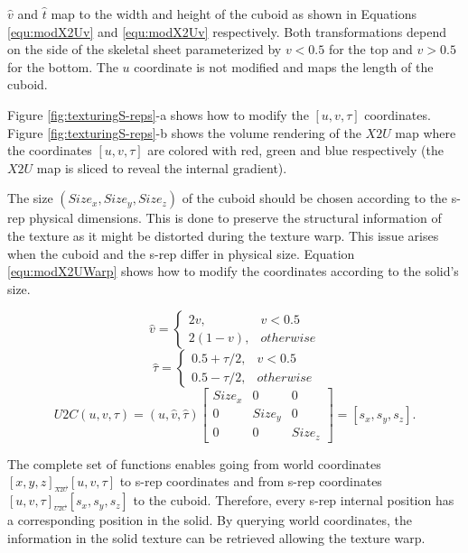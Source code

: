 $\hat v$ and $\hat t$
map to the width and height of the cuboid 
as shown in Equations \ref{equ:modX2Uv} and \ref{equ:modX2Uv} respectively. 
Both transformations depend on the side of the skeletal sheet parameterized by $v < 0.5$ for the top 
and $v > 0.5$ for the bottom.
The $u$ coordinate is not modified and maps the length of the cuboid.

Figure \ref{fig:texturingS-reps}-a shows 
how to modify the $[u, v, \tau]$ coordinates. Figure \ref{fig:texturingS-reps}-b
shows the volume rendering of the $X2U$ map where
the coordinates $[u, v, \tau]$ are colored with red, green and blue respectively (the $X2U$ map is sliced to reveal the internal gradient). 

The size $(Size_x, Size_y, Size_z)$ of the cuboid should be chosen according to the s-rep physical dimensions. 
This is done to preserve the structural information of the texture as it 
might be distorted during the texture warp. This issue arises when the cuboid and the s-rep differ in physical size.
Equation \ref{equ:modX2UWarp} 
shows how to modify the coordinates according to the solid's size.


\begin{equation}
 \hat{v} = \left \{ \begin{array}{ll} 
                     2v,  & v < 0.5 \\
                     2(1 - v), & otherwise
                    \end{array} \right .
  \label{equ:modX2Uv}
\end{equation}
\begin{equation}
 \hat{\tau} = \left \{ \begin{array}{ll} 
                     0.5 + \tau/2, & v < 0.5 \\
                     0.5 - \tau/2, & otherwise
                    \end{array} \right .
  \label{equ:modX2Ut}
\end{equation}
\begin{equation}
  U2C(u, v, \tau) = (u, \hat{v}, \hat{\tau}) \left [ \begin{matrix}
							  Size_x & 0 & 0 \\
							  0 & Size_y & 0 \\
							  0 & 0 & Size_z
							\end{matrix} \right ] = [s_x, s_y, s_z]. 
  \label{equ:modX2UWarp}
\end{equation}

The complete set of functions enables going from world coordinates $[x, y, z] {}_{\overrightarrow{{}_{X2U}}} [u, v, \tau]$
to s-rep coordinates
and from s-rep coordinates $[u, v, \tau] {}_{\overrightarrow{{}_{U2C}}} [s_x, s_y, s_z]$
to the cuboid. Therefore, every s-rep internal position has a corresponding position in the solid.
By querying world coordinates, the information in the solid texture can be retrieved
allowing the texture warp.

